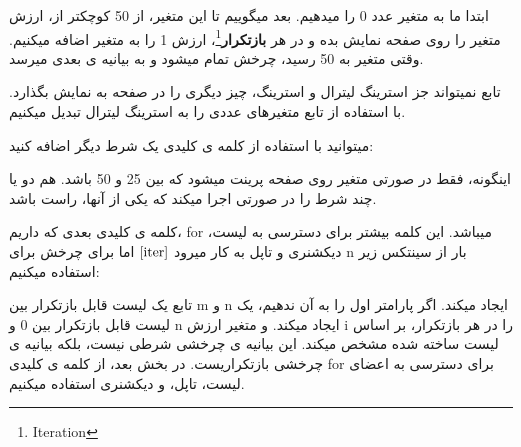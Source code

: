 \documentclass[14pt,a4paper]{memoir}
\begin{document}
	 
	ابتدا ما به متغیر   عدد 0 را میدهیم. بعد میگوییم تا این متغیر، از 50 کوچکتر از، ارزش متغیر را روی صفحه نمایش بده و در هر \textbf{بازتکرار}\footnote{Iteration}، ارزش 1 را به متغیر اضافه میکنیم. وقتی متغیر به 50 رسید، چرخش تمام میشود و به بیانیه ی بعدی میرسد. 
	
	\begin{tip}
	تابع  نمیتواند جز استرینگ لیترال و استرینگ، چیز دیگری را در صفحه به نمایش بگذارد. با استفاده از تابع   متغیرهای عددی را به استرینگ لیترال تبدیل میکنیم.
	\end{tip}
	 
	 
	 
	 
	 میتوانید با استفاده از کلمه ی کلیدی  یک شرط دیگر اضافه کنید:
	 
	 \begin{latin}
	
\end{latin}
	 
	 
	 اینگونه، فقط در صورتی متغیر روی صفحه پرینت میشود که بین 25 و 50 باشد.  هم دو یا چند شرط را در صورتی اجرا میکند که یکی از آنها، راست باشد. 
	 
	 کلمه ی کلیدی بعدی که داریم، for میباشد. این کلمه بیشتر برای دسترسی به لیست، دیکشنری و تاپل به کار میرود \(\ref{iter}\) اما برای چرخش برای n بار از سینتکس زیر استفاده میکنیم:
	 
	 
	 
	 
	 	 
\begin{latin}
	 	
	 \end{latin}
	 
	 
	 
	 تابع   یک لیست قابل بازتکرار بین m و n ایجاد میکند. اگر پارامتر اول را به آن ندهیم، یک لیست قابل بازتکرار بین 0 و n ایجاد میکند. و متغیر ارزش i را در هر بازتکرار، بر اساس لیست ساخته شده مشخص میکند. این بیانیه ی چرخشی شرطی نیست، بلکه بیانیه ی چرخشی بازتکراریست. در بخش بعد، از کلمه ی کلیدی for برای دسترسی به اعضای لیست، تاپل، و دیکشنری استفاده میکنیم.
	 
\end{document}
